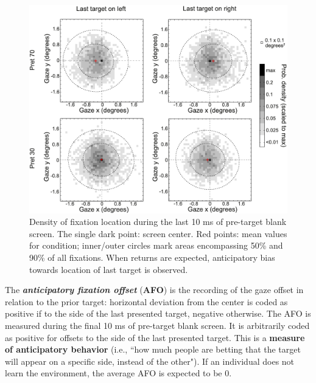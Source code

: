 \begin{figure}[!ht]
    \centering
    \captionsetup{width=.8\linewidth}
    \includegraphics[width=0.6\linewidth]{images/afo.png}
    \caption{Density of fixation location during the last 10 ms of pre-target blank screen. The single dark point: screen center. Red points: mean values for condition; inner/outer circles mark areas encompassing 50\% and 90\% of all fixations. When returns are expected, anticipatory bias towards location of last target is observed.}
    \label{fig:afo}
\end{figure}

The \textbf{\textit{anticipatory fixation offset}} (\textbf{AFO}) is the recording of the gaze offset in relation to the prior target: horizontal deviation from the center is coded as positive if to the side of the last presented target, negative otherwise. The AFO is measured during the final 10 ms of pre-target blank screen. It is arbitrarily coded as positive for offsets to the side of the last presented target. This is a \textbf{measure of anticipatory behavior} (i.e., ``how much people are betting that the target will appear on a specific side, instead of the other"). If an individual does not learn the environment, the average AFO is expected to be 0.

